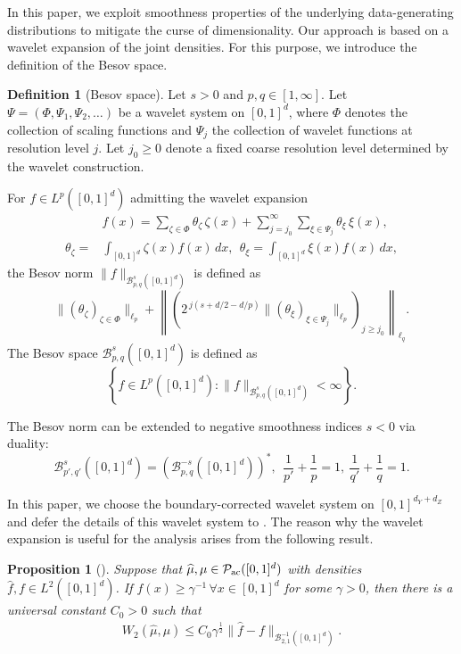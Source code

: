 \documentclass{article}
\theoremstyle{plain}
\newtheorem{proposition}{Proposition}[section]
\theoremstyle{definition}
\newtheorem{definition}{Definition}[section]
\def\calB{\mathcal{B}}
\def\calP{\mathcal{P}}
\theoremstyle{plain}
\def\calB{\mathcal{B}}
\def\calP{\mathcal{P}}
\begin{document}
In this paper, we exploit smoothness properties of the underlying data-generating distributions to mitigate the curse of dimensionality. Our approach is based on a wavelet expansion of the joint densities. For this purpose, we introduce the definition of the Besov space.
\begin{definition}[Besov space]\label{defi:Besov.space}
Let $s>0$ and $p,q\in[1,\infty]$.
Let $\Psi=(\Phi,\Psi_1,\Psi_2,\ldots)$ be a wavelet system on $[0,1]^d$,
where $\Phi$ denotes the collection of scaling functions and $\Psi_j$ the collection of wavelet functions at resolution level $j$.
Let $j_0\ge 0$ denote a fixed coarse resolution level determined by the wavelet construction.

For $f\in L^p([0,1]^d)$ admitting the wavelet expansion
\begin{align*}    
&f(x)
=
\sum_{\zeta\in\Phi}\theta_\zeta\,\zeta(x)
+
\sum_{j=j_0}^\infty\sum_{\xi\in\Psi_j}\theta_\xi\,\xi(x),\\
\theta_\zeta=&\int_{[0,1]^d}\zeta(x)f(x)\,dx, ~~
\theta_\xi=\int_{[0,1]^d}\xi(x)f(x)\,dx,
\end{align*}
the Besov norm $\|f\|_{\mathcal B^s_{p,q}([0,1]^d)}$ is defined as
\[
\|(\theta_\zeta)_{\zeta\in\Phi}\|_{\ell_p}
+
\left\|
\left(
2^{\,j(s+d/2-d/p)}
\|(\theta_\xi)_{\xi\in\Psi_j}\|_{\ell_p}
\right)_{j\ge j_0}
\right\|_{\ell_q}.
\]
The Besov space $\mathcal B^s_{p,q}([0,1]^d)$ is defined as
\[
\left\{
f\in L^p([0,1]^d):
\|f\|_{\mathcal B^s_{p,q}([0,1]^d)}<\infty
\right\}.
\]
\end{definition}
The Besov norm can be extended to negative smoothness indices $s<0$ via duality:
\[
\mathcal B^{s}_{p',q'}([0,1]^d)
=
(\mathcal B^{-s}_{p,q}([0,1]^d))^*,
~~
\frac{1}{p'}+\frac{1}{p}=1,~
\frac{1}{q'}+\frac{1}{q}=1.
\]

In this paper, we choose the boundary-corrected wavelet system on $[0,1]^{d_Y + d_Z}$ and defer the details of this wavelet system to . The reason why the wavelet expansion is useful for the analysis arises from the following result.
\begin{proposition}[{\cite[Theorem 4]{niles2022minimax}}]
    Suppose that $\widehat \mu, \mu \in \calP_{\textup{ac}}([0,1]^d)$ with densities $\hat f, f \in L^2([0,1]^d)$. If $f(x) \geq \gamma^{-1}\,\forall x\in[0,1]^d$ for some $\gamma > 0$, then there is a universal constant $C_{0}>0$ such that
    \begin{align*}
        W_2(\widehat \mu, \mu) \leq C_{0} \gamma^{\frac{1}{2}}  \|\hat f - f\|_{\calB_{2,1}^{-1}([0,1]^d)}.
    \end{align*}
\end{proposition}
\end{document}
